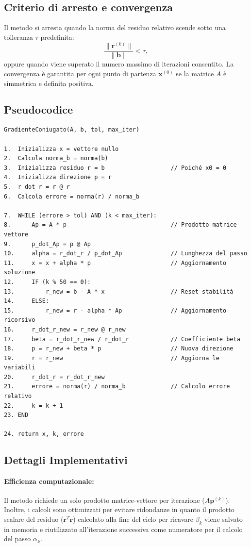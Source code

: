 \documentclass[a4paper, 12pt]{report}
\begin{document}
\subsection*{Criterio di arresto e convergenza}
Il metodo si arresta quando la norma del residuo relativo scende sotto
una tolleranza $\tau$ predefinita:
\[
    \frac{\|\mathbf{r}^{(k)}\|}{\|\mathbf{b}\|} < \tau,
\]
oppure quando viene superato il numero massimo di iterazioni consentito.
La convergenza è garantita per ogni punto di partenza $\mathbf{x}^{(0)}$ se
la matrice $A$ è simmetrica e definita positiva.

\subsection*{Pseudocodice}
\begin{verbatim}
GradienteConiugato(A, b, tol, max_iter)

1.  Inizializza x = vettore nullo
2.  Calcola norma_b = norma(b)
3.  Inizializza residuo r = b                   // Poiché x0 = 0
4.  Inizializza direzione p = r
5.  r_dot_r = r @ r
6.  Calcola errore = norma(r) / norma_b

7.  WHILE (errore > tol) AND (k < max_iter):
8.      Ap = A * p                              // Prodotto matrice-vettore
9.      p_dot_Ap = p @ Ap
10.     alpha = r_dot_r / p_dot_Ap              // Lunghezza del passo
11.     x = x + alpha * p                       // Aggiornamento soluzione
12.     IF (k % 50 == 0):
13.         r_new = b - A * x                   // Reset stabilità
14.     ELSE:
15.         r_new = r - alpha * Ap              // Aggiornamento ricorsivo
16.     r_dot_r_new = r_new @ r_new
17.     beta = r_dot_r_new / r_dot_r            // Coefficiente beta
18.     p = r_new + beta * p                    // Nuova direzione
19.     r = r_new                               // Aggiorna le variabili
20.     r_dot_r = r_dot_r_new
21.     errore = norma(r) / norma_b             // Calcolo errore relativo
22.     k = k + 1
23. END

24. return x, k, errore
\end{verbatim}

\subsection*{Dettagli Implementativi}

\paragraph{Efficienza computazionale:} 
Il metodo richiede un solo prodotto matrice-vettore per iterazione ($A\mathbf{p}^{(k)}$). Inoltre, i calcoli sono ottimizzati per evitare ridondanze in quanto il prodotto scalare del residuo ($\mathbf{r}^T\mathbf{r}$) calcolato alla fine del ciclo per ricavare $\beta_k$ viene salvato in memoria e riutilizzato all'iterazione successiva come numeratore per il calcolo del passo $\alpha_k$.
\end{document}
